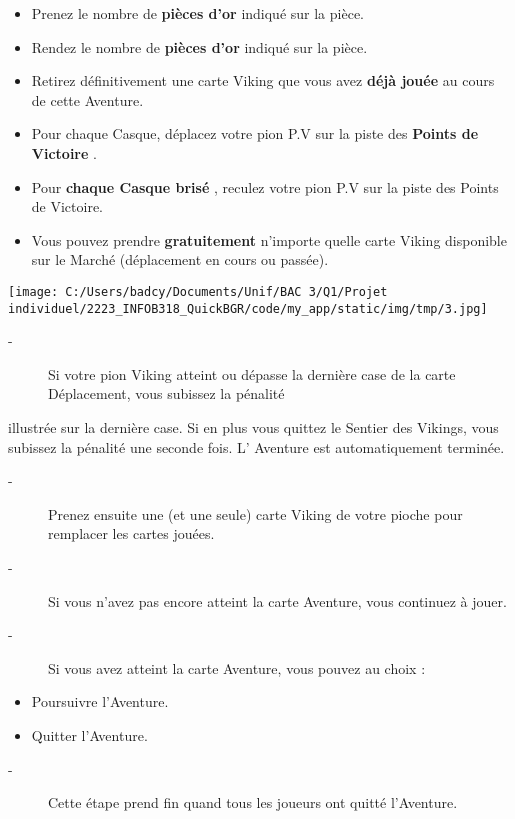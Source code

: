 \documentclass{scrartcl}%
\begin{document}
\begin{itemize}%
\item%
%
 Prenez le nombre de %
\textcolor{mygreen}{%
\textbf{pièces d'or}%
}%
\textit{ }%
 indiqué sur la pièce.
%
\item%
%
 Rendez le nombre de %
\textcolor{mygreen}{%
\textbf{pièces d'or}%
}%
\textit{ }%
 indiqué sur la pièce.
%
\item%
%
 Retirez définitivement une carte Viking que vous avez %
\textcolor{mygreen}{%
\textbf{déjà jouée}%
}%
\textit{ }%
 au cours de cette Aventure.
%
\item%
%
 Pour chaque Casque, déplacez votre pion P.V sur la piste des %
\textcolor{mygreen}{%
\textbf{Points de Victoire}%
}%
.
%
\item%
%
 Pour %
\textcolor{mygreen}{%
\textbf{chaque Casque brisé}%
}%
, reculez votre pion P.V sur la piste des Points de Victoire.
%
\item%
%
 Vous pouvez prendre %
\textcolor{mygreen}{%
\textbf{gratuitement}%
}%
\textit{ }%
 n'importe quelle carte Viking disponible sur le Marché (déplacement en cours ou passée).
%
\end{itemize}%
%
\begin{center}\texttt{[image: C:/Users/badcy/Documents/Unif/BAC 3/Q1/Projet individuel/2223\_INFOB318\_QuickBGR/code/my\_app/static/img/tmp/3.jpg]}\end{center}%

%
\begin{description}%
\item[{-} ]%
%
 Si votre pion Viking atteint ou dépasse la dernière case de la carte Déplacement, vous subissez la pénalité
%
\end{description}%
illustrée sur la dernière case. Si en plus vous quittez le Sentier des Vikings, vous subissez la pénalité une seconde
%
fois. L’ Aventure est automatiquement terminée.
%
\begin{description}%
\item[{-} ]%
%
 Prenez ensuite une (et une seule) carte Viking de votre pioche pour remplacer les cartes jouées.
%
\item[{-} ]%
%
 Si vous n'avez pas encore atteint la carte Aventure, vous continuez à jouer.
%
\item[{-} ]%
%
 Si vous avez atteint la carte Aventure, vous pouvez au choix :
%
\end{description}%
\begin{itemize}%
\item%
%
 Poursuivre l'Aventure.
%
\item%
%
 Quitter l'Aventure.
%
\end{itemize}%
\begin{description}%
\item[{-} ]%
%
 Cette étape prend fin quand tous les joueurs ont quitté l'Aventure.
%
\end{description}
\end{document}
